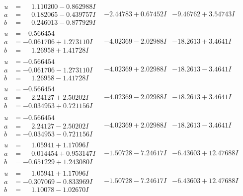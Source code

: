\documentclass[1p]{elsarticle_modified}
\theoremstyle{definition}
\begin{document}
$$\begin{array}{c|c|c}
\begin{aligned}
u &= \phantom{-}1.110200 - 0.862988 I \\
a &= \phantom{-}0.182065 - 0.439757 I \\
b &= \phantom{-}0.246013 - 0.877929 I\end{aligned}
 & -2.44783 + 0.67452 I & -9.46762 + 3.54743 I \\ \hline\begin{aligned}
u &= -0.566454\phantom{ +0.000000I} \\
a &= -0.061706 + 1.273110 I \\
b &= \phantom{-}1.26958 + 1.41728 I\end{aligned}
 & -4.02369 - 2.02988 I & -18.2613 + 3.4641 I \\ \hline\begin{aligned}
u &= -0.566454\phantom{ +0.000000I} \\
a &= -0.061706 - 1.273110 I \\
b &= \phantom{-}1.26958 - 1.41728 I\end{aligned}
 & -4.02369 + 2.02988 I & -18.2613 - 3.4641 I \\ \hline\begin{aligned}
u &= -0.566454\phantom{ +0.000000I} \\
a &= \phantom{-}2.24127 + 2.50202 I \\
b &= -0.034953 + 0.721156 I\end{aligned}
 & -4.02369 - 2.02988 I & -18.2613 + 3.4641 I \\ \hline\begin{aligned}
u &= -0.566454\phantom{ +0.000000I} \\
a &= \phantom{-}2.24127 - 2.50202 I \\
b &= -0.034953 - 0.721156 I\end{aligned}
 & -4.02369 + 2.02988 I & -18.2613 - 3.4641 I \\ \hline\begin{aligned}
u &= \phantom{-}1.05941 + 1.17096 I \\
a &= \phantom{-}0.014454 + 0.953147 I \\
b &= -0.651229 + 1.243080 I\end{aligned}
 & -1.50728 - 7.24617 I & -6.43603 + 12.47688 I \\ \hline\begin{aligned}
u &= \phantom{-}1.05941 + 1.17096 I \\
a &= -0.307069 - 0.833969 I \\
b &= \phantom{-}1.10078 - 1.02670 I\end{aligned}
 & -1.50728 - 7.24617 I & -6.43603 + 12.47688 I \\ \hline\begin{aligned}

\end{aligned}
\end{array}$$
\end{document}
